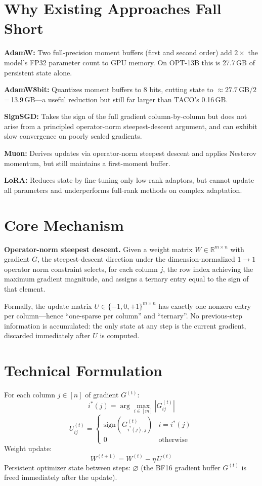 \documentclass[10pt,twocolumn]{article}
\begin{document}
\section{Why Existing Approaches Fall Short}

\textbf{AdamW:} Two full-precision moment buffers (first and second order) add
$2\times$ the model's FP32 parameter count to GPU memory. On OPT-13B this is
27.7\,GB of persistent state alone.

\textbf{AdamW8bit:} Quantizes moment buffers to 8 bits, cutting state to
$\approx 27.7$\,GB/$2$\,=\,13.9\,GB---a useful reduction but still far larger
than TACO's 0.16\,GB.

\textbf{SignSGD:} Takes the sign of the full gradient column-by-column but does
not arise from a principled operator-norm steepest-descent argument, and can
exhibit slow convergence on poorly scaled gradients.

\textbf{Muon:} Derives updates via operator-norm steepest descent and applies
Nesterov momentum, but still maintains a first-moment buffer.

\textbf{LoRA:} Reduces state by fine-tuning only low-rank adaptors, but cannot
update all parameters and underperforms full-rank methods on complex adaptation.

\section{Core Mechanism}

\textbf{Operator-norm steepest descent.} Given a weight matrix $W \in \mathbb{R}^{m\times n}$
with gradient $G$, the steepest-descent direction under the dimension-normalized
$1 \to 1$ operator norm constraint selects, for each column $j$, the row index
achieving the maximum gradient magnitude, and assigns a ternary entry equal to
the sign of that element.

Formally, the update matrix $U \in \{-1, 0, +1\}^{m \times n}$ has exactly
one nonzero entry per column---hence ``one-sparse per column'' and ``ternary''.
No previous-step information is accumulated: the only state at any step is the
current gradient, discarded immediately after $U$ is computed.

\section{Technical Formulation}

For each column $j \in [n]$ of gradient $G^{(t)}$:
\[
i^*(j) = \arg\max_{i \in [m]} |G_{ij}^{(t)}|
\]
\[
U_{ij}^{(t)} = \begin{cases}
  \mathrm{sign}\!\left(G_{i^*(j),j}^{(t)}\right) & i = i^*(j) \\
  0 & \text{otherwise}
\end{cases}
\]
Weight update:
\[
W^{(t+1)} = W^{(t)} - \eta\, U^{(t)}
\]
Persistent optimizer state between steps: $\varnothing$ (the BF16 gradient
buffer $G^{(t)}$ is freed immediately after the update).
\end{document}
